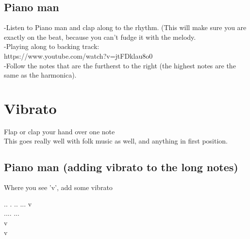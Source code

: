 
        \subsection{Piano man}
           -Listen to Piano man and clap along to the rhythm. (This will make sure you are exactly on the beat, because you can't fudge it with the melody.\\
           -Playing along to backing track: \\https://www.youtube.com/watch?v=jtFDklau8o0 \\
           -Follow the notes that are the furtherst to the right (the highest notes are the same as the harmonica).
           
           
           \section{Vibrato}
    Flap or clap your hand over one note\\
    This goes really well with folk music as well, and anything in first position. \\
    
   \subsection{Piano man (adding vibrato to the long notes)}
   Where you see 'v', add some vibrato
   
        \six.. \6. \six.. \5...\five \5 \five v \\ 
\four.... \4 \five \fdv ... \\
\five\5\six\6\six\5\five\5\five v \\
\four \5 \five \4 \four v 